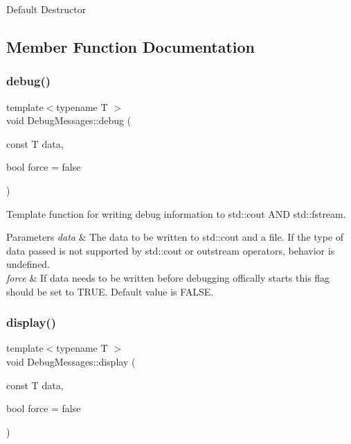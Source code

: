 Default Destructor 

\subsection{Member Function Documentation}
\mbox{\label{classDebugMessages_aac71fdadaf41ce9a3dd7dd502096fb51}} 
\subsubsection{\texorpdfstring{debug()}{debug()}}
{\footnotesize\ttfamily template$<$typename T $>$ \\
void Debug\+Messages\+::debug (\begin{DoxyParamCaption}\item[{const T}]{data,  }\item[{bool}]{force = {\ttfamily false} }\end{DoxyParamCaption})\hspace{0.3cm}{\ttfamily [inline]}}

Template function for writing debug information to std\+::cout A\+ND std\+::fstream.


\begin{DoxyParams}{Parameters}
{\em data} & The data to be written to std\+::cout and a file. If the type of data passed is not supported by std\+::cout or outstream operators, behavior is undefined.\\
\hline
{\em force} & If data needs to be written before debugging offically starts this flag should be set to T\+R\+UE. Default value is F\+A\+L\+SE. \\
\hline
\end{DoxyParams}
\mbox{\label{classDebugMessages_a09343725fb16b9e9d3c5587880e8401e}} 
\subsubsection{\texorpdfstring{display()}{display()}}
{\footnotesize\ttfamily template$<$typename T $>$ \\
void Debug\+Messages\+::display (\begin{DoxyParamCaption}\item[{const T}]{data,  }\item[{bool}]{force = {\ttfamily false} }\end{DoxyParamCaption})\hspace{0.3cm}{\ttfamily [inline]}}


